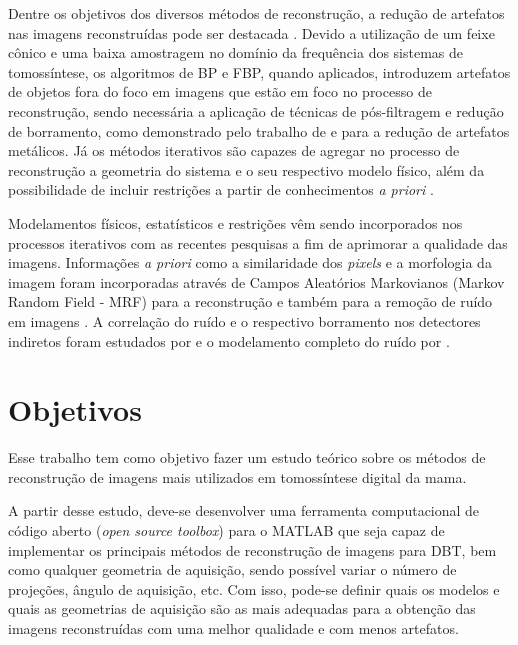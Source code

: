 Dentre os objetivos dos diversos métodos de reconstrução, a redução de artefatos nas imagens reconstruídas pode ser destacada \cite{hu2008image}. Devido a utilização de um feixe cônico e uma baixa amostragem no domínio da frequência dos sistemas de tomossíntese, os algoritmos de \acs{BP} e \acs{FBP}, quando aplicados, introduzem artefatos de objetos fora do foco em imagens que estão em foco no processo de reconstrução, sendo necessária a aplicação de técnicas de pós-filtragem e redução de borramento, como demonstrado pelo trabalho de  e  para a redução de artefatos metálicos. Já os métodos iterativos são capazes de agregar no processo de reconstrução a geometria do sistema e o seu respectivo modelo físico, além da possibilidade de incluir restrições a partir de conhecimentos \textit{a priori} \cite{xu2015statistical,levakhina2013weighted}.

Modelamentos físicos, estatísticos e restrições vêm sendo incorporados nos processos iterativos com as recentes pesquisas a fim de aprimorar a qualidade das imagens. Informações \textit{a priori} como a similaridade dos \textit{pixels} e a morfologia da imagem foram incorporadas através de Campos Aleatórios Markovianos (Markov Random Field - \acs{MRF}) para a reconstrução \cite{xu2015statistical} e também para a remoção de ruído em imagens \cite{salvadeo2016nonlocal}. A correlação do ruído e o respectivo borramento nos detectores indiretos foram estudados por  e o modelamento completo do ruído por .   


\section{Objetivos}

Esse trabalho tem como objetivo fazer um estudo teórico sobre os métodos de reconstrução de imagens mais utilizados em tomossíntese digital da mama. %

A partir desse estudo, deve-se desenvolver uma ferramenta computacional de código aberto (\textit{open source toolbox}) para o MATLAB que seja capaz de implementar os principais métodos de reconstrução de imagens para \acs{DBT}, bem como qualquer geometria de aquisição, sendo possível variar o número de projeções, ângulo de aquisição, etc. Com isso, pode-se definir quais os modelos e quais as geometrias de aquisição são as mais adequadas para a obtenção das imagens reconstruídas com uma melhor qualidade e com menos artefatos.

